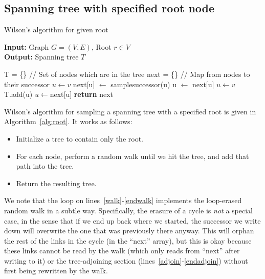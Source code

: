\documentclass[11pt]{article}
\begin{document}
\subsection{Spanning tree with specified root node}
\begin{algorithm}
\caption{Wilson's algorithm for given root}
\label{alg:root}
\textbf{Input: }Graph $G=(V,E)$, Root $r \in V$ \\
\textbf{Output: }Spanning tree $T$
\begin{algorithmic}[1]
\STATE T = \{\}                   // Set of nodes which are in the tree
\STATE next = \{\}                // Map from nodes to their successor
\STATE $u \leftarrow v$
\label{walk}
\STATE next[u] $\leftarrow$ samplesuccessor(u)
\STATE u $\leftarrow$ next[u]
\ENDWHILE \label{endwalk}
\STATE $u \leftarrow v$
 \label{adjoin}
\STATE T.add(u)
\STATE $u \leftarrow $next[u]
\ENDWHILE \label{endadjoin}
\ENDFOR
\STATE \textbf{return} next
\end{algorithmic}
\end{algorithm}

Wilson's algorithm for sampling a spanning tree with a specified root is given
in Algorithm~\ref{alg:root}. It works as follows:
\begin{itemize}
\item Initialize a tree to contain only the root.
\item For each node, perform a random walk until we hit the tree, and add that
path into the tree.
\item Return the resulting tree.
\end{itemize}


We note that the loop on lines~\ref{walk}-\ref{endwalk} implements the
loop-erased random walk in a subtle way.  Specifically, the erasure of a cycle is
\emph{not} a special case, in the sense that if we end up back where we started,
the successor we write down will overwrite the one that was previously there
anyway. This will orphan the rest of the links in the cycle (in the ``next''
array), but this is okay because these links cannot be read by the walk (which only
reads from ``next'' after writing to it) or the tree-adjoining section
(lines~\ref{adjoin}-\ref{endadjoin}) without first being rewritten by the
walk.
\end{document}
